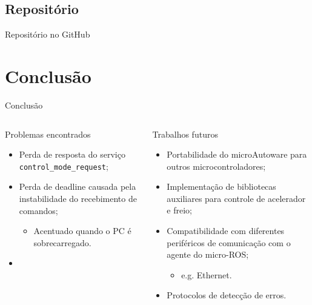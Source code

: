 \documentclass{if-beamer}
\begin{document}
\subsection*{Repositório}

\begin{frame}{Repositório no GitHub}
	
	
	
\end{frame}


\section{Conclusão}

\begin{frame}{Conclusão}
	
	\begin{columns}
		
		\begin{column}{0.435\textwidth}
			
			\begin{block}{Problemas encontrados}
				
				\begin{itemize}
					\item Perda de resposta do serviço \texttt{control\_mode\_request};	
					\pause
					\item Perda de deadline causada pela instabilidade do recebimento de comandos;	
					\pause
					\begin{itemize}
						\item Acentuado quando o PC é sobrecarregado.
					\end{itemize}	
					\pause
					\item 
				\end{itemize}
				
			\end{block}
			
		\end{column}
	
\pause
		
		\begin{column}{0.435\textwidth}
			
			\begin{block}{Trabalhos futuros}
				
				\begin{itemize}
					\item Portabilidade do microAutoware para outros microcontroladores;	
					\pause
					\item Implementação de bibliotecas auxiliares para controle de acelerador e freio;	
					\pause
					\item Compatibilidade com diferentes periféricos de comunicação com o agente do micro-ROS;
					\begin{itemize}
						\item e.g. Ethernet.						
					\end{itemize}	
					\pause
					\item Protocolos de detecção de erros.
				\end{itemize}
				

\end{block}
\end{column}
\end{columns}
\end{frame}
\end{document}
